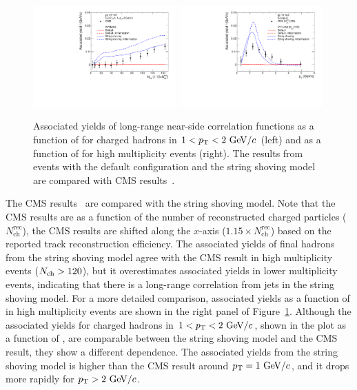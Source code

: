 \begin{figure}[!h]
\includegraphics[width=0.49\textwidth]{figures/cmsmult.pdf}
\includegraphics[width=0.49\textwidth]{figures/cmspt.pdf}
\caption{Associated yields of long-range near-side correlation functions as a function of \Nch for charged hadrons in $1<\mbox{$p_{\mathrm{T}}$}<2~\mathrm{GeV}/c$ (left) and as a function of \pt for high multiplicity events (right). The results from \pythia events with the default configuration and the string shoving model are compared with CMS results~\cite{Khachatryan:2015lva}.}
\label{fig:ay}
\end{figure}

The CMS results~\cite{Khachatryan:2015lva} are compared with the string shoving model.
Note that the CMS results are as a function of the number of reconstructed charged particles ($N_\mathrm{ch}^\mathrm{rec}$), the CMS results are shifted along the $x$-axis ($1.15\times N_\mathrm{ch}^\mathrm{rec}$) based on the reported track reconstruction efficiency.
The associated yields of final hadrons from the string shoving model agree with the CMS result in high multiplicity events ($\mbox{$N_\mathrm{ch}$}>120$), but it overestimates associated yields in lower multiplicity events, indicating that there is a long-range correlation from jets in the string shoving model.
For a more detailed comparison, associated yields as a function of \pt in high multiplicity events are shown in the right panel of Figure~\ref{fig:ay}.
Although the associated yields for charged hadrons in $1<\mbox{$p_{\mathrm{T}}$}<2~\mathrm{GeV}/c$, shown in the plot as a function of \Nch, are comparable between the string shoving model and the CMS result, they show a different \pt dependence.
The associated yields from the string shoving model is higher than the CMS result around $\mbox{$p_{\mathrm{T}}$}=1~\mathrm{GeV}/c$, and it drops more rapidly for $\mbox{$p_{\mathrm{T}}$}>2~\mathrm{GeV}/c$.


